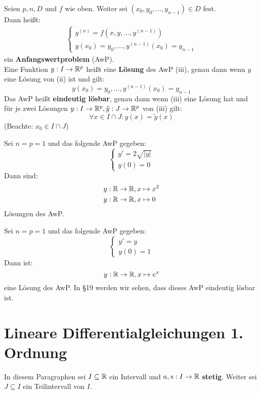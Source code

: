 \documentclass[a4paper,oneside,DIV15,BCOR12mm,chapterprefix=true,headings=onelinechapter]{scrbook}
\begin{document}
\begin{definition}
Seien $p,n,D$ und $f$ wie oben. Weiter sei $(x_0,y_0,\ldots,y_{n-1})\in D$ fest.\\
Dann heißt:
\begin{align*}
\begin{cases}y^{(n)}=f(x,y,\ldots,y^{(n-1)})\\
y(x_0)=y_0,\ldots,y^{(n-1)}(x_0)=y_{n-1}\end{cases}\tag{iii}
\end{align*}
ein \textbf{Anfangswertproblem} (AwP).\\
Eine Funktion $y:I\to\mathbb{R}^p$ heißt eine \textbf{Lösung} des AwP (iii), genau dann
wenn $y$ eine Lösung von (ii) ist und gilt:
\[y(x_0)=y_0,\ldots,y^{(n-1)}(x_0)=y_{n-1}\]
Das AwP heißt \textbf{eindeutig lösbar}, genau dann wenn (iii) eine Lösung hat und
für je zwei Lösungen $y:I\to\mathbb{R}^p,\tilde y:J\to\mathbb{R}^p$ von (iii) gilt:
\[\forall x\in I\cap J:y(x)=\tilde y(x)\]
(Beachte: $x_0\in I\cap J$)
\end{definition}

\begin{beispiele}
\item Sei $n=p=1$ und das folgende AwP gegeben:
\[\begin{cases}
y'=2\sqrt{|y|}\\
y(0)=0
\end{cases}\]
Dann sind:
\begin{align*}
&y:\mathbb{R}\to\mathbb{R}, x\mapsto x^2\\
&y:\mathbb{R}\to\mathbb{R}, x\mapsto 0
\end{align*}
Lösungen des AwP.
\item Sei $n=p=1$ und das folgende AwP gegeben:
\[\begin{cases}
y'=y\\
y(0)=1
\end{cases}\]
Dann ist:
\[y:\mathbb{R}\to\mathbb{R}, x\mapsto e^x\]
eine Lösung des AwP. In §19 werden wir sehen, dass dieses AwP eindeutig lösbar ist.
\end{beispiele}

\chapter{Lineare Differentialgleichungen 1. Ordnung}
In diesem Paragraphen sei $I\subseteq\mathbb{R}$ ein Intervall und $a,s:I\to\mathbb{R}$ \textbf{stetig}.
Weiter sei $J\subseteq I$ ein Teilintervall von $I$.
\end{document}
